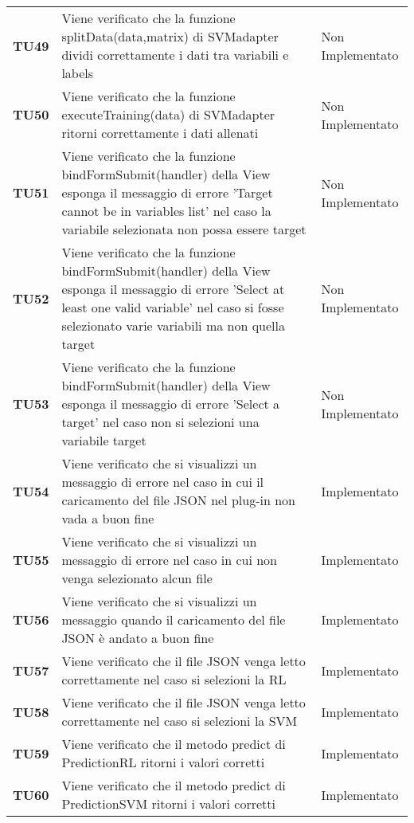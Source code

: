 \documentclass[../piano-di-qualifica.tex]{subfiles}
\begin{document}
\begin{longtable}[H]{>{\centering\bfseries}m{2.5cm} >{\centering}m{7.5cm} >{\centering\arraybackslash}m{3.5cm}}
  \textbf{TU49} & Viene verificato che la funzione splitData(data,matrix) di SVMadapter dividi correttamente i dati tra variabili e labels & Non Implementato \\
  \textbf{TU50} & Viene verificato che la funzione executeTraining(data) di SVMadapter ritorni correttamente i dati allenati & Non Implementato \\
  \textbf{TU51} & Viene verificato che la funzione bindFormSubmit(handler) della View esponga il messaggio di errore 'Target cannot be in variables list' nel caso la variabile selezionata non possa essere target  & Non Implementato \\
  \textbf{TU52} & Viene verificato che la funzione bindFormSubmit(handler) della View esponga il messaggio di errore 'Select at least one valid variable' nel caso si fosse selezionato varie variabili ma non quella target  & Non Implementato \\
  \textbf{TU53} & Viene verificato che la funzione bindFormSubmit(handler) della View esponga il messaggio di errore 'Select a target' nel caso non si selezioni una variabile target  & Non Implementato \\
  \textbf{TU54} & Viene verificato che si visualizzi un messaggio di errore nel caso in cui il caricamento del file JSON nel plug-in non vada a buon fine & Implementato \\
  \textbf{TU55} & Viene verificato che si visualizzi un messaggio di errore nel caso in cui non venga selezionato alcun file & Implementato \\
  \textbf{TU56} & Viene verificato che si visualizzi un messaggio quando il caricamento del file JSON è andato a buon fine & Implementato \\
  \textbf{TU57} & Viene verificato che il file JSON venga letto correttamente nel caso si selezioni la RL & Implementato \\
  \textbf{TU58} & Viene verificato che il file JSON venga letto correttamente nel caso si selezioni la SVM & Implementato \\
  \textbf{TU59} & Viene verificato che il metodo predict di PredictionRL ritorni i valori corretti & Implementato \\
  \textbf{TU60} & Viene verificato che il metodo predict di PredictionSVM ritorni i valori corretti & Implementato \\
\end{longtable}
\end{document}
